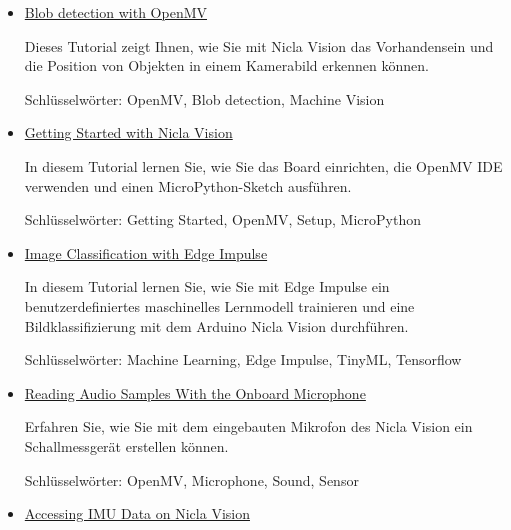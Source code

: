 \begin{itemize}
	\item \href{https://docs.arduino.cc/tutorials/nicla-vision/blob-detection}{Blob detection with OpenMV}
	
	Dieses Tutorial zeigt Ihnen, wie Sie mit Nicla Vision das Vorhandensein und die Position von Objekten in einem Kamerabild erkennen können.
	
	\medskip
	
	Schlüsselwörter: OpenMV, Blob detection, Machine Vision
	
	\medskip
	
	\item \href{https://docs.arduino.cc/tutorials/nicla-vision/getting-started}{Getting Started with Nicla Vision}
	
	In diesem Tutorial lernen Sie, wie Sie das Board einrichten, die OpenMV IDE verwenden und einen MicroPython-Sketch ausführen.
	
	\medskip
	
	
	Schlüsselwörter: Getting Started, OpenMV, Setup, MicroPython
	
	\medskip
	
	\item \href{https://docs.arduino.cc/tutorials/nicla-vision/image-classification}{Image Classification with Edge Impulse}
	
	In diesem Tutorial lernen Sie, wie Sie mit Edge Impulse ein benutzerdefiniertes maschinelles Lernmodell trainieren und eine Bildklassifizierung mit dem Arduino Nicla Vision durchführen.
	
	\medskip
	
	Schlüsselwörter: Machine Learning, Edge Impulse, TinyML, Tensorflow
	
	\medskip
	
	\item \href{https://docs.arduino.cc/tutorials/nicla-vision/microphone_sensor}{Reading Audio Samples With the Onboard Microphone}
	
	Erfahren Sie, wie Sie mit dem eingebauten Mikrofon des Nicla Vision ein Schallmessgerät erstellen können.
	
	\medskip
	
	Schlüsselwörter:         OpenMV,   Microphone,  Sound,      Sensor
	
	\medskip	
	
	
	\item \href{https://docs.arduino.cc/tutorials/nicla-vision/nicla-vision-imu}{Accessing IMU Data on Nicla Vision}
	

\end{itemize}
